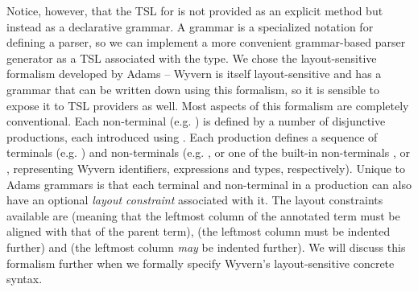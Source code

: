 Notice, however, that the TSL for  is not provided as an explicit  method but instead as a declarative grammar. A grammar is a specialized notation for defining a parser, so we can implement a more convenient grammar-based parser generator  as a TSL associated with the  type. We chose the  layout-sensitive formalism developed by Adams \cite{Adams:2013:PPI:2429069.2429129} -- Wyvern is itself layout-sensitive and has a grammar that can be written down using this formalism, so it is sensible to expose it to TSL providers as well. Most aspects of this formalism are completely conventional. 
Each non-terminal (e.g. ) is defined by a number of disjunctive productions, each introduced using \li{->}. Each production defines a sequence of terminals (e.g. ) and non-terminals (e.g. , or one of the built-in non-terminals ,  or , representing Wyvern identifiers, expressions and types, respectively). Unique to Adams grammars is that each terminal and non-terminal in a production can also have an optional \emph{layout constraint} associated with it. The layout constraints available are \li{=} (meaning that the leftmost column of the annotated term must be aligned with that of the parent term), \li{>} (the leftmost column must be indented further) and \li{>=} (the leftmost column \emph{may} be indented further). We will discuss this formalism further when we formally specify Wyvern's layout-sensitive concrete syntax.

